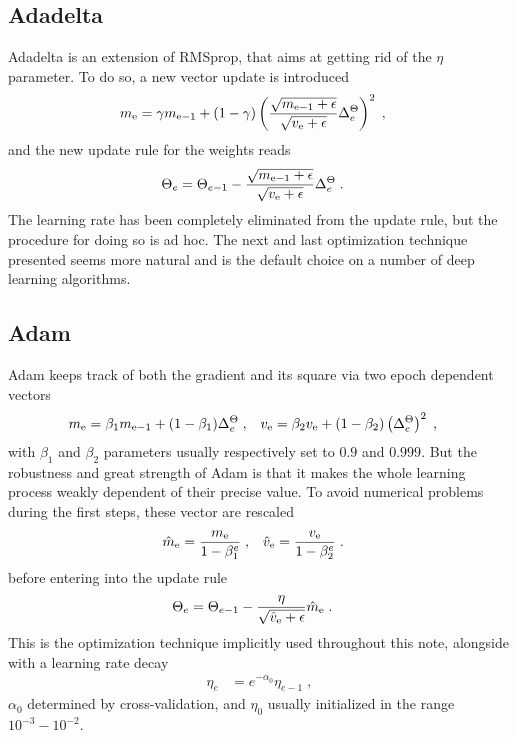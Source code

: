 \subsection{Adadelta}

Adadelta\cite{journals/corr/abs-1212-5701} is an extension of RMSprop, that aims at getting rid of the $\eta$ parameter. To do so, a new vector update is introduced
\begin{align}
m_{{\rm e}}&=\gamma m_{{\rm e-1}}+(1-\gamma )
%
\left(\frac{\sqrt{m_{{\rm e-1}}+\epsilon}}{\sqrt{v_{{\rm e}}+\epsilon}}\Delta^{\Theta}_{e}\right)^2\;,
\end{align}
and the new update rule for the weights reads
\begin{align}
\Theta_e&=\Theta_{e-1}-\frac{\sqrt{m_{{\rm e-1}}+\epsilon}}{\sqrt{v_{{\rm e}}+\epsilon}}\Delta^{\Theta}_{e}\;.
\end{align}
The learning rate has been completely eliminated from the update rule, but the procedure for doing so is ad hoc. The next and last optimization technique presented seems more natural and is the default choice on a number of deep learning algorithms.
\subsection{Adam}

Adam\cite{Kingma2014} keeps track of both the gradient and its square via two epoch dependent vectors
\begin{align}
m_{{\rm e}}&= \beta_1 m_{{\rm e-1}}+ (1-\beta_1)\Delta^{\Theta}_{e}\;,&
%
v_{{\rm e}}&= \beta_2 v_{{\rm e}}+ (1-\beta_2)\left(\Delta^{\Theta}_{e}\right)^2\;,
\end{align}
with $\beta_1$ and $\beta_2$ parameters usually respectively set to $0.9$ and $0.999$. But the robustness and great strength of Adam is that it makes the whole learning process weakly dependent of their precise value. To avoid numerical problems during the first steps, these vector are rescaled
\begin{align}
\hat{m}_{{\rm e}}&= \frac{m_{{\rm e}}}{1-\beta_1^{e}}\;,&
%
\hat{v}_{{\rm e}}&=  \frac{v_{{\rm e}}}{1-\beta_2^{e}}\;.
\end{align}
before entering into the update rule
\begin{align}
\Theta_e&=\Theta_{e-1}-\frac{\eta }{\sqrt{\hat{v}_{{\rm e}}+\epsilon}}\hat{m}_{{\rm e}}\;.
\end{align}
This is the optimization technique implicitly used throughout this note, alongside with a learning rate decay
\begin{align}
\eta_e&=e^{-\alpha_0}\eta_{e-1}\;,
\end{align}
$\alpha_0$ determined by cross-validation, and $\eta_0$ usually initialized in the range $10^{-3}-10^{-2}$.

